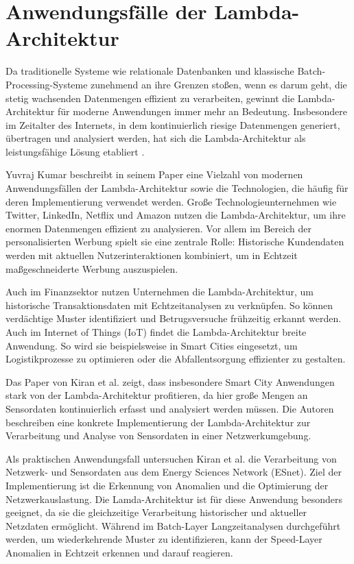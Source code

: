 \section{Anwendungsfälle der Lambda-Architektur}
Da traditionelle Systeme wie relationale Datenbanken und klassische Batch-Processing-Systeme zunehmend an ihre Grenzen stoßen, wenn es darum geht, die stetig wachsenden Datenmengen effizient zu verarbeiten, gewinnt die Lambda-Architektur für moderne Anwendungen immer mehr an Bedeutung. Insbesondere im Zeitalter des Internets, in dem kontinuierlich riesige Datenmengen generiert, übertragen und analysiert werden, hat sich die Lambda-Architektur als leistungsfähige Lösung etabliert \cite{kumar2020lambda,kiran2015lambda,katkar2015study}.

Yuvraj Kumar \cite{kumar2020lambda} beschreibt in seinem Paper eine Vielzahl von modernen Anwendungsfällen der Lambda-Architektur sowie die Technologien, die häufig für deren Implementierung verwendet werden. Große Technologieunternehmen wie Twitter, LinkedIn, Netflix und Amazon nutzen die Lambda-Architektur, um ihre enormen Datenmengen effizient zu analysieren. Vor allem im Bereich der personalisierten Werbung spielt sie eine zentrale Rolle: Historische Kundendaten werden mit aktuellen Nutzerinteraktionen kombiniert, um in Echtzeit maßgeschneiderte Werbung auszuspielen.

Auch im Finanzsektor nutzen Unternehmen die Lambda-Architektur, um historische Transaktionsdaten mit Echtzeitanalysen zu verknüpfen. So können verdächtige Muster identifiziert und Betrugsversuche frühzeitig erkannt werden. Auch im Internet of Things (IoT) findet die Lambda-Architektur breite Anwendung. So wird sie beispielsweise in Smart Cities eingesetzt, um Logistikprozesse zu optimieren oder die Abfallentsorgung effizienter zu gestalten.

Das Paper von Kiran et al. \cite{kiran2015lambda} zeigt, dass insbesondere Smart City Anwendungen stark von der Lambda-Architektur profitieren, da hier große Mengen an Sensordaten kontinuierlich erfasst und analysiert werden müssen. Die Autoren beschreiben eine konkrete Implementierung der Lambda-Architektur zur Verarbeitung und Analyse von Sensordaten in einer Netzwerkumgebung.

Als praktischen Anwendungsfall untersuchen Kiran et al. \cite{kiran2015lambda} die Verarbeitung von Netzwerk- und Sensordaten aus dem Energy Sciences Network (ESnet). Ziel der Implementierung ist die Erkennung von Anomalien und die Optimierung der Netzwerkauslastung. Die Lamda-Architektur ist für diese Anwendung besonders geeignet, da sie die gleichzeitige Verarbeitung historischer und aktueller Netzdaten ermöglicht. Während im Batch-Layer Langzeitanalysen durchgeführt werden, um wiederkehrende Muster zu identifizieren, kann der Speed-Layer Anomalien in Echtzeit erkennen und darauf reagieren. 

